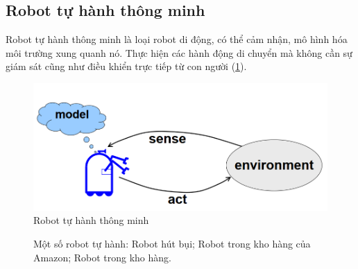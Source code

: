 \subsection{Robot tự hành thông minh}
Robot tự hành thông minh là loại robot di động, có thể cảm nhận, mô hình hóa môi trường xung quanh nó. Thực hiện các hành động di chuyển mà không cần sự giám sát cũng như điều khiển trực tiếp từ con người (\figurename{\ref{fig:intro}}).

\begin{figure}
	\centering
	\includegraphics[width=13cm]{chapter1/figs/intro.png}
	\caption{Robot tự hành thông minh}
	\label{fig:intro}
\end{figure}

\begin{figure}
	\centering
	\hspace{8pt}
	\hspace{8pt}
	\caption[]{Một số robot tự hành: Robot hút bụi;  Robot trong kho hàng của Amazon;  Robot trong kho hàng.}
	\label{fig:rb}
\end{figure}

